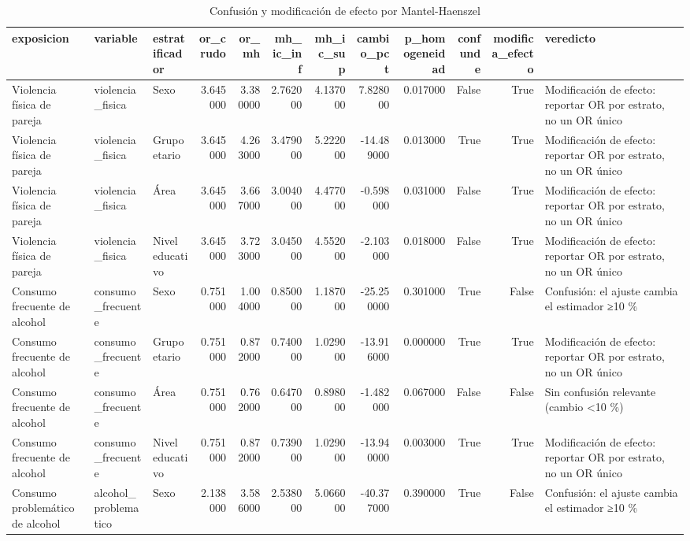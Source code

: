 \begin{table}[htbp]
\caption{Confusión y modificación de efecto por Mantel-Haenszel}
\label{tab:tabla_14_confusion_mantel_haenszel}
\begin{tabular}{lllrrrrrrrrl}
\toprule
exposicion & variable & estratificador & or\_crudo & or\_mh & mh\_ic\_inf & mh\_ic\_sup & cambio\_pct & p\_homogeneidad & confunde & modifica\_efecto & veredicto \\
\midrule
Violencia física de pareja & violencia\_fisica & Sexo & 3.645000 & 3.380000 & 2.762000 & 4.137000 & 7.828000 & 0.017000 & False & True & Modificación de efecto: reportar OR por estrato, no un OR único \\
Violencia física de pareja & violencia\_fisica & Grupo etario & 3.645000 & 4.263000 & 3.479000 & 5.222000 & -14.489000 & 0.013000 & True & True & Modificación de efecto: reportar OR por estrato, no un OR único \\
Violencia física de pareja & violencia\_fisica & Área & 3.645000 & 3.667000 & 3.004000 & 4.477000 & -0.598000 & 0.031000 & False & True & Modificación de efecto: reportar OR por estrato, no un OR único \\
Violencia física de pareja & violencia\_fisica & Nivel educativo & 3.645000 & 3.723000 & 3.045000 & 4.552000 & -2.103000 & 0.018000 & False & True & Modificación de efecto: reportar OR por estrato, no un OR único \\
Consumo frecuente de alcohol & consumo\_frecuente & Sexo & 0.751000 & 1.004000 & 0.850000 & 1.187000 & -25.250000 & 0.301000 & True & False & Confusión: el ajuste cambia el estimador ≥10 \% \\
Consumo frecuente de alcohol & consumo\_frecuente & Grupo etario & 0.751000 & 0.872000 & 0.740000 & 1.029000 & -13.916000 & 0.000000 & True & True & Modificación de efecto: reportar OR por estrato, no un OR único \\
Consumo frecuente de alcohol & consumo\_frecuente & Área & 0.751000 & 0.762000 & 0.647000 & 0.898000 & -1.482000 & 0.067000 & False & False & Sin confusión relevante (cambio <10 \%) \\
Consumo frecuente de alcohol & consumo\_frecuente & Nivel educativo & 0.751000 & 0.872000 & 0.739000 & 1.029000 & -13.940000 & 0.003000 & True & True & Modificación de efecto: reportar OR por estrato, no un OR único \\
Consumo problemático de alcohol & alcohol\_problematico & Sexo & 2.138000 & 3.586000 & 2.538000 & 5.066000 & -40.377000 & 0.390000 & True & False & Confusión: el ajuste cambia el estimador ≥10 \% \\

\end{tabular}
\end{table}
